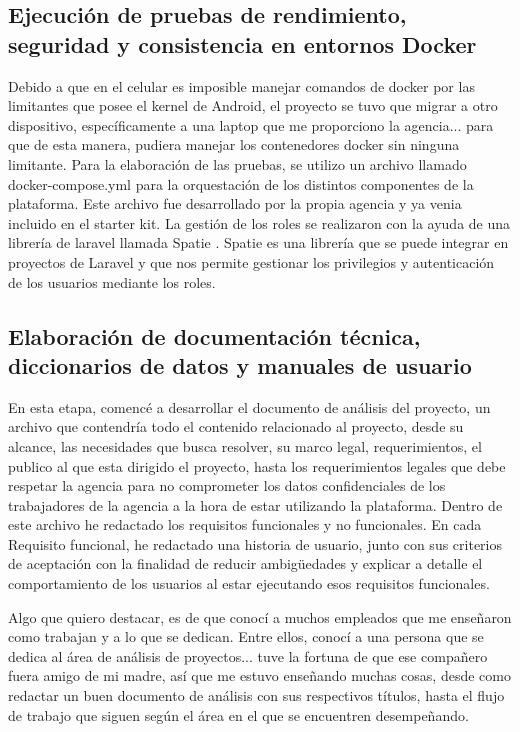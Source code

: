 \documentclass[12pt]{article}
\begin{document}
\clearpage
\subsection{Ejecución de pruebas de rendimiento, seguridad y consistencia en entornos Docker}
Debido a que en el celular es imposible manejar comandos de docker por las limitantes que posee el kernel de Android, el proyecto se tuvo que migrar a otro dispositivo, específicamente a una laptop que me proporciono la agencia... para que de esta manera, pudiera manejar los contenedores docker sin ninguna limitante. Para la elaboración de las pruebas, se utilizo un archivo llamado docker-compose.yml para la orquestación de los distintos componentes de la plataforma. Este archivo fue desarrollado por la propia agencia y ya venia incluido en el starter kit. La gestión de los roles se realizaron con la ayuda de una librería de laravel llamada Spatie \cite{Spatie:documentacion}. Spatie es una librería que se puede integrar en proyectos de Laravel y que nos permite gestionar los privilegios y autenticación de los usuarios mediante los roles.


\clearpage
\subsection{Elaboración de documentación técnica, diccionarios de datos y manuales de usuario}
En esta etapa, comencé a desarrollar el documento de análisis del proyecto, un archivo que contendría todo el contenido relacionado al proyecto, desde su alcance, las necesidades que busca resolver, su marco legal, requerimientos, el publico al que esta dirigido el proyecto, hasta los requerimientos legales que debe respetar la agencia para no comprometer los datos confidenciales de los trabajadores de la agencia a la hora de estar utilizando la plataforma. Dentro de este archivo he redactado los requisitos funcionales y no funcionales. En cada Requisito funcional, he redactado una historia de usuario, junto con sus criterios de aceptación con la finalidad de reducir ambigüedades y explicar a detalle el comportamiento de los usuarios al estar ejecutando esos requisitos funcionales.

Algo que quiero destacar, es de que conocí a muchos empleados que me enseñaron como trabajan y a lo que se dedican. Entre ellos, conocí a una persona que se dedica al área de análisis de proyectos... tuve la fortuna de que ese compañero fuera amigo de mi madre, así que me estuvo enseñando muchas cosas, desde como redactar un buen documento de análisis con sus respectivos títulos, hasta el flujo de trabajo que siguen según el área en el que se encuentren desempeñando.
\end{document}
